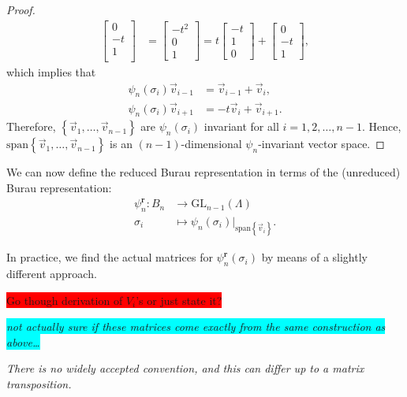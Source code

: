 \begin{proof}
\begin{align*}
\begin{bmatrix}
            0 \\ -t \\ 1 \\
        \end{bmatrix} &= \begin{bmatrix}
            -t^2 \\ 0 \\ 1
        \end{bmatrix} = t\begin{bmatrix}
            -t \\ 1 \\ 0
        \end{bmatrix} + \begin{bmatrix}
            0 \\ -t \\ 1
        \end{bmatrix},
    \end{align*}
    which implies that
    \begin{align*}
        \psi_n(\sigma_i)\vec{v}_{i-1} &= \vec{v}_{i-1} + \vec{v}_{i}, \\
        \psi_n(\sigma_i)\vec{v}_{i+1} &= - t\vec{v}_{i} + \vec{v}_{i+1}.
    \end{align*}
    Therefore, $\left\{ \vec{v}_1,\dots,\vec{v}_{n-1} \right\}$ are $\psi_n(\sigma_i)$ invariant for all $i=1,2,\dots,n-1$. Hence, $\textrm{span}\left\{ \vec{v}_1,\dots,\vec{v}_{n-1} \right\}$ is an $(n-1)$-dimensional $\psi_n$-invariant vector space.
\end{proof}

We can now define the reduced Burau representation in terms of the (unreduced) Burau representation:
\begin{align}
    \psi_n^\textbf{r}:B_n&\to\textrm{GL}_{n-1}(\Lambda) \\
    \sigma_i&\mapsto \psi_n(\sigma_i)\bigr|_{\textrm{span}\left\{ \vec{v}_i \right\}}.
\end{align}

In practice, we find the actual matrices for $\psi_n^\textbf{r}(\sigma_i)$ by means of a slightly different approach.

\colorbox{red}{Go though derivation of $V_i$'s or just state it?}

\colorbox{cyan}{\textit{\footnotesize not actually sure if these matrices come exactly from the same construction as above\dots}}

\textit{There is no widely accepted convention, and this can differ up to a matrix transposition.}

